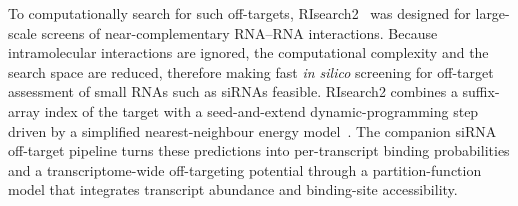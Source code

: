 \documentclass[unnumsec,webpdf,contemporary,large]{oup-authoring-template}
\begin{document}
To computationally search for such off-targets, RIsearch2~\citep{alkan2017risearch2} was designed for large-scale screens of near-complementary RNA--RNA interactions.
Because intramolecular interactions are ignored, the computational complexity and the search space are reduced, therefore making fast \textit{in silico} screening for off-target assessment of small RNAs such as siRNAs feasible.
RIsearch2 combines a suffix-array index of the target with a seed-and-extend dynamic-programming step driven \citep{alkan2017risearch2} by a simplified nearest-neighbour energy model~\citep{wenzel2012risearch}.
The companion siRNA off-target pipeline turns these predictions into per-transcript binding probabilities and a transcriptome-wide off-targeting potential through a partition-function model that integrates transcript abundance and binding-site accessibility.
\end{document}
